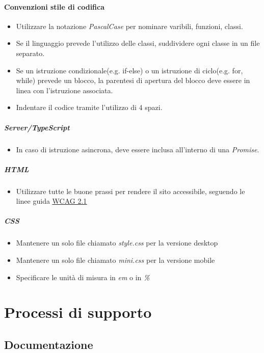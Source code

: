 \documentclass[a4paper, 12pt]{article}
\begin{document}
\paragraph{Convenzioni stile di codifica}
\begin{itemize}
	\item Utilizzare la notazione \textit{PascalCase} per nominare varibili, funzioni, classi.
	\item Se il linguaggio prevede l'utilizzo delle classi, suddividere ogni classe in un file separato.
	\item Se un istruzione condizionale(e.g. if-else) o un istruzione di ciclo(e.g. for, while) prevede un blocco,
	la parentesi di apertura del blocco deve essere in linea con l'istruzione associata.
	\item Indentare il codice tramite l'utilizzo di 4 spazi.
\end{itemize}
\subparagraph{Server/TypeScript}
\begin{itemize}
	\item In caso di istruzione asincrona, deve essere inclusa all'interno di una \textit{Promise}.
\end{itemize}
\subparagraph{HTML}
\begin{itemize}
	\item Utilizzare tutte le buone prassi per rendere il sito accessibile, seguendo le linee guida 
	\href{https://www.w3.org/Translations/WCAG21-it/}{\underline{WCAG 2.1}}
\end{itemize}
\subparagraph{CSS}
	\begin{itemize}
		\item Mantenere un solo file chiamato \textit{style.css} per la versione desktop 
		\item Mantenere un solo file chiamato \textit{mini.css} per la versione mobile
		\item Specificare le unità di misura in \textit{em} o in \textit{\%}
	\end{itemize}

\section{Processi di supporto}
\subsection{Documentazione}
\end{document}
